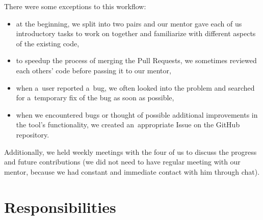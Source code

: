 \documentclass[licencjacka,en]{pracamgr}
\begin{document}
There were some exceptions to this workflow:
\begin{itemize}
	\item at the beginning, we split into two pairs and our mentor gave each of us introductory
		tasks to work on together and familiarize with different aspects of the existing code,
	\item to speedup the process of merging the Pull Requests, we sometimes reviewed each others'
		code before passing it to our mentor,
	\item when a~user reported a~bug, we often looked into the problem and searched for a~temporary
		fix of the bug as soon as possible,
	\item when we encountered bugs or thought of possible additional improvements in the tool's
		functionality, we created an~appropriate Issue on the GitHub repository.
\end{itemize}

Additionally, we held weekly meetings with the four of us to discuss the progress and future
contributions (we did not need to have regular meeting with our mentor, because we had constant
and immediate contact with him through chat).

\section{Responsibilities}\label{r:section_responsibilities}
\end{document}
